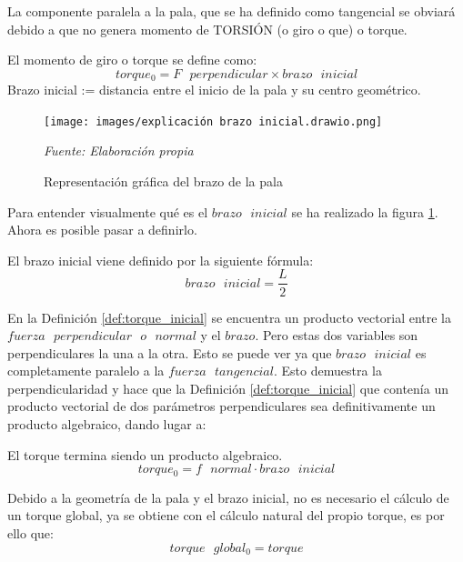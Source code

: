   La componente paralela a la pala, que se ha definido como tangencial se obviará debido a que no genera momento de TORSIÓN (o giro o que) o torque. 
  
  \begin{definicion}
El momento de giro o torque se define como:
 $$ torque_0 = F \text{ } perpendicular \times brazo \text{ } inicial$$
 \label{def:torque_inicial}
 Brazo inicial := distancia entre el inicio de la pala y su centro geométrico. \\
 \end{definicion}
 

     \textbf{}
    \begin{figure}[H]
    \centering
    \texttt{[image: images/explicación brazo inicial.drawio.png]}
    \caption{Representación gráfica del brazo de la pala}
    \label{fig:exp_brazo_inicial}
    \textit{Fuente: Elaboración propia}
\end{figure}
 

Para entender visualmente qué es el $brazo \text{ } inicial$ se ha realizado la figura \ref{fig:exp_brazo_inicial}. Ahora es posible pasar a definirlo.

\begin{definicion}
El  brazo inicial viene definido por la siguiente fórmula:
$$ brazo \text{ } inicial = \dfrac{L}{2}$$
\end{definicion}
 
 En la Definición \ref{def:torque_inicial} se encuentra un producto vectorial entre la $fuerza  \text{ }perpendicular \text{ } o \text{ } normal$ y el $brazo$. Pero estas dos variables son perpendiculares la una a la otra. Esto se puede ver ya que $brazo \text{ } inicial$ es completamente paralelo a la $fuerza \text{ } tangencial$. Esto demuestra la perpendicularidad y hace que la Definición \ref{def:torque_inicial} que contenía un producto vectorial de dos parámetros perpendiculares sea definitivamente un producto algebraico, dando lugar a:
 
  \begin{definicion}
  El torque termina siendo un producto algebraico.
 $$ torque_0 = f \text{ } normal \cdot brazo \text{ } inicial$$
 \label{def:torque_algebraico_inicial}
 \end{definicion}
 
   \begin{definicion}
Debido a la geometría de la pala y el brazo inicial, no es necesario el cálculo de un torque global, ya se obtiene con el cálculo natural del propio torque, es por ello que:
 $$ torque \text{ } global_0 = torque$$
 \label{def:torque_global_inicial}
 \end{definicion}
 
